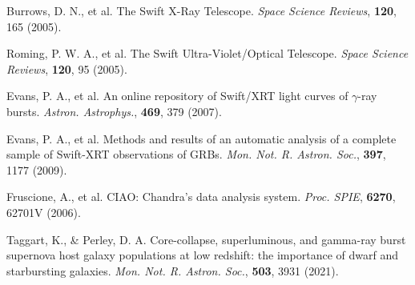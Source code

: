 \documentclass{nature_plusfigure}
\newcommand{\mn}{{Mon. Not. R. Astron. Soc.}}
\newcommand{\mnras}{\mn}
\newcommand{\aap}{{Astron. Astrophys.}}
\newcommand{\procspie}{Proc. SPIE}
\newcommand{\ssr}{Space Science Reviews}
\begin{document}
\begin{methods}
\begin{thebibliography}{10}
 Burrows, D. N., et al. The Swift X-Ray Telescope. \emph{\ssr}, \textbf{120}, 165 (2005). 

 Roming, P. W. A., et al. The Swift Ultra-Violet/Optical Telescope. \emph{\ssr}, \textbf{120}, 95 (2005).

 Evans, P. A., et al. An online repository of Swift/XRT light curves of $\gamma$-ray bursts. \emph{\aap}, \textbf{469}, 379 (2007). 

 Evans, P. A., et al. Methods and results of an automatic analysis of a complete sample of Swift-XRT observations of GRBs. \emph{\mnras}, \textbf{397}, 1177 (2009). 

 Fruscione, A., et al. CIAO: Chandra's data analysis system. \emph{\procspie}, \textbf{6270}, 62701V (2006). 


 Taggart, K., \& Perley, D. A. Core-collapse, superluminous, and gamma-ray burst supernova host galaxy populations at low redshift: the importance of dwarf and starbursting galaxies. \emph{\mnras}, \textbf{503}, 3931 (2021). 

\end{thebibliography}

\end{methods}
\end{document}
